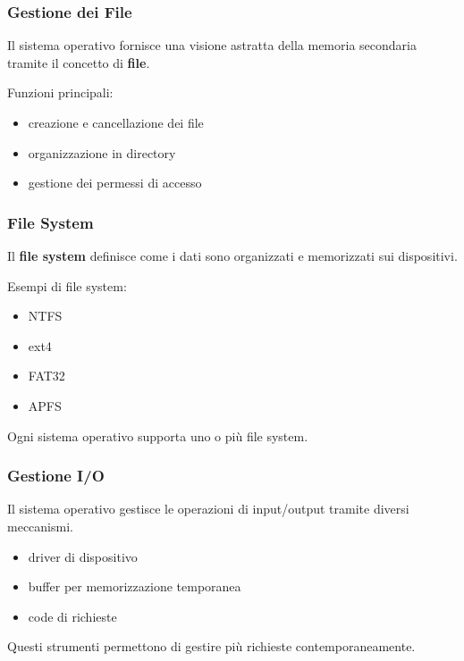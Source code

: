 \documentclass{beamer}
\begin{document}

\begin{frame}
	\frametitle{Gestione dei File}
	
	Il sistema operativo fornisce una visione
	astratta della memoria secondaria tramite
	il concetto di \textbf{file}.
	
	Funzioni principali:
	
	\begin{itemize}
		\item creazione e cancellazione dei file
		\item organizzazione in directory
		\item gestione dei permessi di accesso
	\end{itemize}
	
\end{frame}


\begin{frame}
	\frametitle{File System}
	
	Il \textbf{file system} definisce come i dati
	sono organizzati e memorizzati sui dispositivi.
	
	Esempi di file system:
	
	\begin{itemize}
		\item NTFS
		\item ext4
		\item FAT32
		\item APFS
	\end{itemize}
	
	Ogni sistema operativo supporta uno o più
	file system.
	
\end{frame}


\begin{frame}
	\frametitle{Gestione I/O}
	
	Il sistema operativo gestisce le operazioni
	di input/output tramite diversi meccanismi.
	
	\begin{itemize}
		\item driver di dispositivo
		\item buffer per memorizzazione temporanea
		\item code di richieste
	\end{itemize}
	
	Questi strumenti permettono di gestire
	più richieste contemporaneamente.
	
\end{frame}
\end{document}
